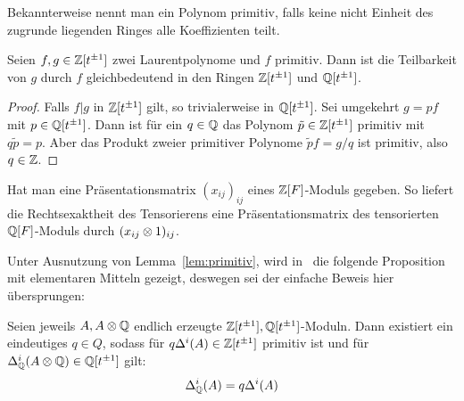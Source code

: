 	 Bekannterweise nennt man ein Polynom primitiv, falls keine nicht Einheit des zugrunde liegenden Ringes alle Koeffizienten teilt. 
	 \begin{lem}
	 \label{lem:primitiv}
	 	Seien $f,g \in \mathbb{Z}[t^{\pm 1}]$ zwei Laurentpolynome und $f$ primitiv. Dann ist die Teilbarkeit von $g$ durch $f$ gleichbedeutend in den Ringen $\mathbb{Z}[t^{\pm 1}]$ und $\mathbb{Q}[t^{\pm 1}]$.
	 \end{lem}
	 \begin{proof}
	 	Falls $f|g$ in $\mathbb{Z}[t^{\pm 1}] $ gilt, so trivialerweise in $\mathbb{Q}[t^{\pm 1}]$. Sei umgekehrt $g=pf$ mit $p \in \mathbb{Q}[t^{\pm 1}]$. Dann ist für ein $q \in \mathbb{Q}$ das Polynom $\tilde p \in \mathbb{Z}[t^{\pm 1}]$ primitiv mit $q\tilde p = p$. Aber das Produkt zweier primitiver Polynome $\tilde p f = g/q$ ist primitiv, also $q \in \mathbb{Z}$.
	 \end{proof}

	 \begin{bem}
	 	Hat man eine Präsentationsmatrix $(x_{ij})_{ij}$ eines $\mathbb{Z}[F]$-Moduls gegeben. So liefert die Rechtsexaktheit des Tensorierens eine Präsentationsmatrix des tensorierten $\mathbb{Q}[F]$-Moduls durch $(x_{ij} \otimes 1)_{ij}$.
	 \end{bem}

	 Unter Ausnutzung von Lemma~\ref{lem:primitiv}, wird in~\cite[Lemma~2.2]{Shinohara.1972} die folgende Proposition mit elementaren Mitteln gezeigt, deswegen sei der einfache Beweis hier übersprungen:
	 \begin{prop}
	 	\label{prop:tensoring}
	 	Seien jeweils $A,A\otimes \mathbb{Q}$ endlich erzeugte $\mathbb{Z}[t^{\pm 1}], \mathbb{Q}[t^{\pm 1}]$-Moduln. Dann existiert ein eindeutiges $q\in Q$, sodass für $q\Delta^i(A) \in \mathbb{Z}[t^{\pm 1}]$ primitiv ist und für $\Delta^i_{\mathbb{Q}}(A\otimes \mathbb{Q}) \in \mathbb{Q}[t^{\pm 1}]$ gilt:
	 	\[
	 		 \Delta^i_{\mathbb{Q}}(A) = q\Delta^i(A) 
	 	\]
	 \end{prop}